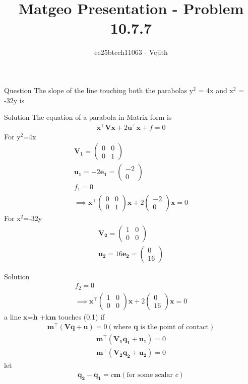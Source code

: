 \documentclass{beamer}
\title{Matgeo Presentation - Problem 10.7.7}
\author{ee25btech11063 - Vejith}
\numberwithin{equation}{section}
\providecommand{\brak}[1]{\ensuremath{\left(#1\right)}}
\theoremstyle{remark}
\newcommand{\myvec}[1]{\ensuremath{\begin{pmatrix}#1\end{pmatrix}}}
\let\vec\mathbf
\begin{document}
\frame{\titlepage}
\begin{frame}{Question}
  The slope of the line touching both the parabolas y$^2$ = 4x and x$^2$ = -32y is
\end{frame}

\begin{frame}{Solution}
    The equation of a parabola in Matrix form is
\begin{align}
\vec{x}^\top\vec{V}\vec{x} + 2\vec{u}^\top\vec{x} + f = 0
\end{align}
For y$^2$=4x
\begin{align}
    \vec{V_1}=\begin{pmatrix}
        0 & 0\\
        0 & 1
    \end{pmatrix}\\
    \vec{u_1}=-2\vec{e_1}=\myvec{-2\\0}\\
    f_1=0\\
    \implies \vec{x}^\top \begin{pmatrix}
        0 & 0\\
        0 &1
    \end{pmatrix}\vec{x} +2\myvec{-2\\0}\vec{x}=0
\end{align}
For x$^2$=-32y
\begin{align}
    \vec{V_2}=\begin{pmatrix}
        1 & 0\\
        0 & 0
    \end{pmatrix}\\
    \vec{u_2}= 16\vec{e_2}=\myvec{0\\16}
    \end{align}
    \end{frame}

    \begin{frame}{Solution}
        \begin{align}
    f_2=0\\
    \implies \vec{x}^\top \begin{pmatrix}
        1 & 0\\
        0 & 0
    \end{pmatrix}\vec{x} +2\myvec{0\\16}\vec{x}=0
\end{align}
a line $\vec{x}$=$\vec{h}$ +k$\vec{m}$ touches (0.1) if
\begin{align}
    \vec{m}^\top \brak{\vec{V}\vec{q}+\vec{u}}=0 
    \brak{\text{where $\vec{q}$ is the point of contact}}
\end{align}
\begin{align}
     \vec{m}^\top \brak{\vec{V_1}\vec{q_1}+\vec{u_1}}=0\\
      \vec{m}^\top \brak{\vec{V_2}\vec{q_2}+\vec{u_2}}=0 
\end{align}
let 
\begin{align}
    \vec{q_2}-\vec{q_1}=c\vec{m}
    \brak{\text{for some scalar }c}
\end{align}
\end{frame}
\end{document}
